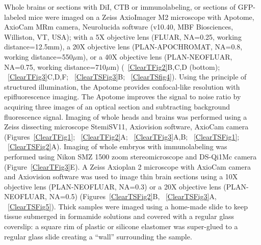 Whole brains or sections with DiI, CTB or immunolabeling, or sections of GFP-labeled mice were imaged on a Zeiss AxioImager M2 microscope with Apotome, AxioCam MRm camera, Neurolucida software (v10.40, MBF Biosciences, Williston, VT, USA); with a 5X objective lens (FLUAR, NA=0.25, working distance=12.5mm), a 20X objective lens (PLAN-APOCHROMAT, NA=0.8, working distance=550$\mu$m), or a 40X objective lens (PLAN-NEOFLUAR, NA=0.75, working distance=710$\mu$m) (~\ref{ClearTFig2}B,C,D (bottom); ~\ref{ClearTFig3}C,D,F; ~\ref{ClearTSFig3}B; ~\ref{ClearTSfig4}).
Using the principle of structured illumination, the Apotome provides confocal-like resolution with epifluorescence imaging.
The Apotome improves the signal to noise ratio by acquiring three images of an optical section and subtracting background fluorescence signal.
Imaging of whole heads and brains was performed using a Zeiss dissecting microscope StemiSV11, Axiovision software, AxioCam camera (Figures~\ref{ClearTFig1}; ~\ref{ClearTFig2}A; ~\ref{ClearTFig3}A,B; ~\ref{ClearTSFig1}; ~\ref{ClearTSFig2}A).
Imaging of whole embryos with immunolabeling was performed using Nikon SMZ 1500 zoom stereomicroscope and DS-Qi1Mc camera (Figure~\ref{ClearTFig3}E).
A Zeiss Axioplan 2 microscope with AxioCam camera and Axiovision software was used to image thin brain sections using a 10X objective lens (PLAN-NEOFLUAR, NA=0.3) or a 20X objective lens (PLAN-NEOFLUAR, NA=0.5) (Figures~\ref{ClearTSFig2}B, ~\ref{ClearTSFig3}A, ~\ref{ClearTSFig5}).
Thick samples were imaged using a home-made slide to keep tissue submerged in formamide solutions and covered with a regular glass coverslip: a square rim of plastic or silicone elastomer was super-glued to a regular glass slide creating a ``wall'' surrounding the sample.
